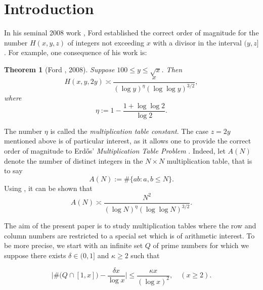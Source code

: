 \documentclass{amsart}
\newtheorem{theorem}{Theorem}[section]
\theoremstyle{definition}
\numberwithin{equation}{section}
\newcommand{\density}{\delta}
\newcommand{\mtc}{\eta}
\begin{document}
	\section{Introduction}
	In his seminal 2008 work \cite{ford2008distribution}, Ford established the correct order of magnitude for the number $H(x,y,z)$ of integers not exceeding $x$ with a divisor in the interval $(y,z]$. For example, one consequence of his work is:
	\begin{theorem}[Ford \cite{ford2008distribution}, 2008] Suppose $100 \leq y \leq \sqrt{x}$. Then\label{fordthm}
		\begin{equation}\label{fordmain H}
			H(x,y,2y) \asymp \frac{x}{(\log y)^\mtc(\log \log y)^{3/2}},
		\end{equation}
		where 
		$$\mtc:=1-\frac{1+\log \log 2}{\log 2}.$$
	\end{theorem}
	The number $\mtc$ is called the \textit{multiplication table constant}. The case $z =2y$ mentioned above is of particular interest, as it allows one to provide the correct order of magnitude to Erd\H{o}s' \textit{Multiplication Table Problem} \cite{Erdos1960}. Indeed, let $A(N)$ denote the number of distinct integers in the $N \times N$ multiplication table, that is to say
	$$A(N) := \#\{ab: a,b\leq N\}.$$
	Using , it can be shown \cite[Corollary 3]{ford2008distribution} that $$A(N) \asymp \frac{N^2}{(\log N)^\mtc(\log \log N)^{3/2}}.$$
	
	The aim of the present paper is to study multiplication tables where the row and column numbers are restricted to a special set which is of arithmetic interest. To be more precise, we start with an infinite set $Q$ of prime numbers for which we suppose there exists ${\density \in (0,1]}$ and $\kappa \ge 2$ such that
	
	\begin{equation}\label{definition of delta}
		\Big|\#\big(Q\cap[1,x]\big) - \frac{ \delta x}{\log x}\Big|\le \frac{\kappa x}{(\log x)^2}, \quad ( x\ge2 ).
	\end{equation}
	
\end{document}

